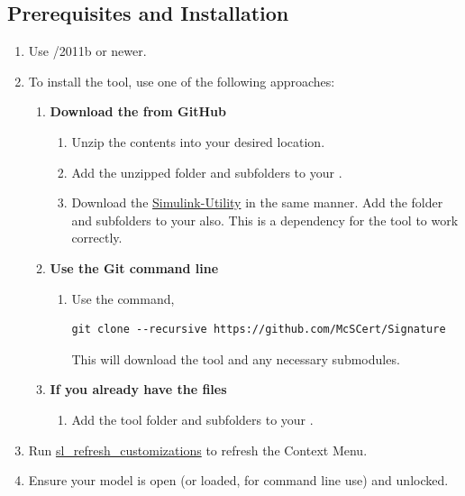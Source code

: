 \documentclass{article}
\begin{document}
\subsection{Prerequisites and Installation}

\begin{enumerate}
	\item Use \Matlab/\Simulink 2011b or newer.
	\item To install the tool, use one of the following approaches:
	\begin{enumerate}
		\item \textbf{Download the  from GitHub}
		\begin{enumerate} 
			\item Unzip the contents into your desired location. 
			\item Add the unzipped folder and subfolders to your \mpath. 
			\item Download the \href{https://github.com/McSCert/Simulink-Utility}{Simulink-Utility} in the same manner. Add the folder and subfolders to your \mpath also. This is a dependency for the tool to work correctly.
		\end{enumerate}
		\item \textbf{Use the Git command line}
			\begin{enumerate}
				\item Use the command, \begin{verbatim}git clone --recursive https://github.com/McSCert/Signature\end{verbatim} This will download the tool and any necessary submodules.
			\end{enumerate}
		\item \textbf{If you already have the files}
			\begin{enumerate}
						\item Add the tool folder and subfolders to your \mpath. 
			\end{enumerate}
	\end{enumerate}
	\item Run \href{https://www.mathworks.com/help/simulink/ug/registering-customizations.html}{sl\_refresh\_customizations} to refresh the Context Menu. 
	\item Ensure your model is open (or loaded, for command line use) and unlocked.
\end{enumerate}
\end{document}
